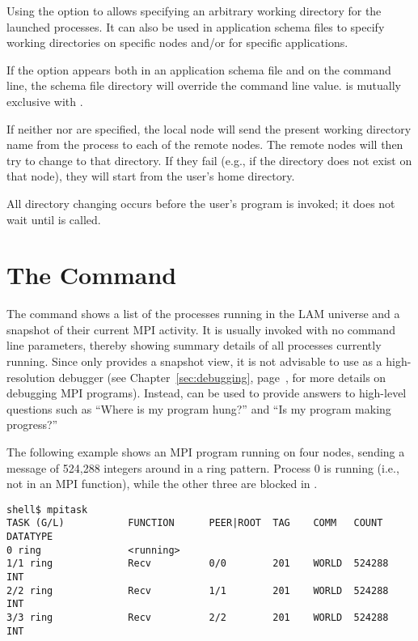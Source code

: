 Using the  option to  allows specifying an
arbitrary working directory for the launched processes.  It can also
be used in application schema files to specify working directories on
specific nodes and/or for specific applications.

If the  option appears both in an application schema file
and on the command line, the schema file directory will override the
command line value.   is mutually exclusive with .

If neither  nor  are specified, the local node
will send the present working directory name from the 
process to each of the remote nodes.  The remote nodes will then try
to change to that directory.  If they fail (e.g., if the directory
does not exist on that node), they will start from the user's home
directory.

All directory changing occurs before the user's program is invoked; it
does not wait until  is called.


\section{The  Command}
\label{sec:commands-mpitask}

The  command shows a list of the processes running in the
LAM universe and a snapshot of their current MPI activity.  It is
usually invoked with no command line parameters, thereby showing
summary details of all processes currently running.  
%
Since  only provides a snapshot view, it is not advisable
to use  as a high-resolution debugger (see
Chapter~\ref{sec:debugging}, page~\pageref{sec:debugging}, for more
details on debugging MPI programs).  Instead,  can be
used to provide answers to high-level questions such as ``Where is my
program hung?'' and ``Is my program making progress?''

The following example shows an MPI program running on four nodes,
sending a message of 524,288 integers around in a ring pattern.
Process 0 is running (i.e., not in an MPI function), while the other
three are blocked in .

\lstset{style=lam-cmdline}
\begin{lstlisting}
shell$ mpitask
TASK (G/L)           FUNCTION      PEER|ROOT  TAG    COMM   COUNT   DATATYPE
0 ring               <running>
1/1 ring             Recv          0/0        201    WORLD  524288  INT
2/2 ring             Recv          1/1        201    WORLD  524288  INT
3/3 ring             Recv          2/2        201    WORLD  524288  INT
\end{lstlisting}

